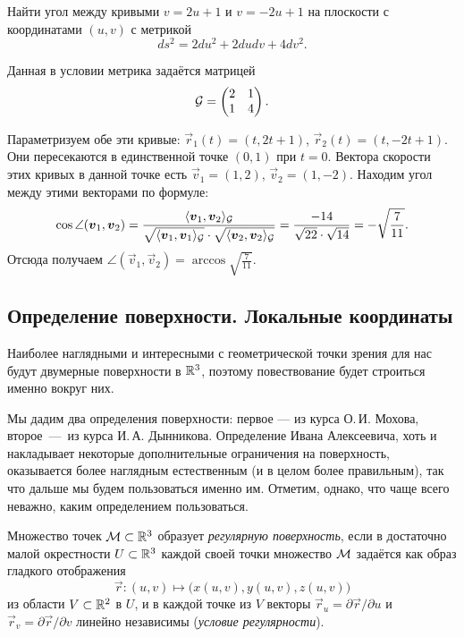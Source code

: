 \begin{problem}
	Найти угол между кривыми $v = 2u + 1$ и $v = -2u + 1$ на плоскости с координатами $(u, v)$ с метрикой
	\[
		ds^2 = 2du^2 + 2dudv + 4dv^2.
	\]
\end{problem}

\begin{solution}
	Данная в условии метрика задаётся матрицей
	\[
		\mathcal{G} =
		\begin{pmatrix}
			2 & 1\\
			1 & 4
		\end{pmatrix}.
	\]

	Параметризуем обе эти кривые: $\vec{r}_1(t) = (t, 2t + 1)$, $\vec{r}_2(t) = (t, -2t + 1)$. Они пересекаются в единственной точке $(0, 1)$ при $t = 0$. Вектора скорости этих кривых в данной точке есть $\vec{v}_1 = (1, 2)$, $\vec{v}_2 = (1, -2)$. Находим угол между этими векторами по формуле:
	\[
		\cos\angle(\boldsymbol{v}_1, \boldsymbol{v}_2) = \frac{\langle\boldsymbol{v}_1, \boldsymbol{v}_2\rangle_{\mathcal{G}}}{\sqrt{\langle\boldsymbol{v}_1, \boldsymbol{v}_1\rangle_{\mathcal{G}}} \cdot \sqrt{\langle\boldsymbol{v}_2, \boldsymbol{v}_2\rangle_{\mathcal{G}}}} = \frac{-14}{\sqrt{22} \cdot \sqrt{14}} = -\sqrt{\frac{7}{11}}.
	\]
	Отсюда получаем $\angle(\vec{v}_1, \vec{v}_2) = \arccos\sqrt{\frac{7}{11}}$.
\end{solution}

\subsection{Определение поверхности. Локальные координаты}

Наиболее наглядными и интересными с геометрической точки зрения для нас будут двумерные поверхности в $\mathbb{R}^3$, поэтому повествование будет строиться именно вокруг них.

Мы дадим два определения поверхности: первое --- из курса О.\,И. Мохова, второе~---~из курса И.\,А. Дынникова. Определение Ивана Алексеевича, хоть и накладывает некоторые дополнительные ограничения на поверхность, оказывается более наглядным естественным (и в целом более правильным), так что дальше мы будем пользоваться именно им. Отметим, однако, что чаще всего неважно, каким определением пользоваться.

\begin{definition}
	Множество точек $\mathcal{M} \subset \mathbb{R}^3$ образует \textit{регулярную поверхность}, если в достаточно малой окрестности $U \subset \mathbb{R}^3$ каждой своей точки множество $\mathcal{M}$ задаётся как образ гладкого отображения
	\[
		\vec{r}\colon (u, v) \mapsto \big(x(u, v), y(u, v), z(u, v)\big)
	\]
	из области $V \subset \mathbb{R}^2$ в $U$, и в каждой точке из $V$ векторы $\vec{r}_u = \partial\vec{r} / \partial u$ и $\vec{r}_v = \partial\vec{r} / {\partial v}$ линейно независимы (\textit{условие регулярности}).
\end{definition}

